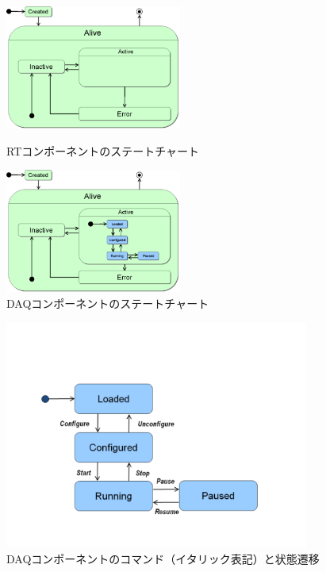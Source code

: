 \documentclass[a4j,10pt,dvips,onecolumn,oneside,final]{jarticle}%
\begin{document}
\begin{figure}[htbp]
 \begin{minipage}{0.48\hsize}
  \begin{center}
   \includegraphics[width=58mm]{rtc-state.pdf}
  \end{center}
  \caption{RTコンポーネントのステートチャート}
  \label{rtc-state.fig}
 \end{minipage}
\hfill
 \begin{minipage}{0.48\hsize}
  \begin{center}
   \includegraphics[width=58mm]{daq-state.pdf}
  \end{center}
  \caption{DAQコンポーネントのステートチャート}
  \label{daq-state.fig}
 \end{minipage}
\end{figure}
 \begin{figure}[h]
   \vspace{-5mm}
  \begin{center}
   \includegraphics[width=100mm]{daq-state-only.pdf}
   \vspace{-5mm}
   \caption{DAQコンポーネントのコマンド（イタリック表記）と状態遷移}
  \label{command-state.fig}
  \end{center}
 \end{figure}
\end{document}
